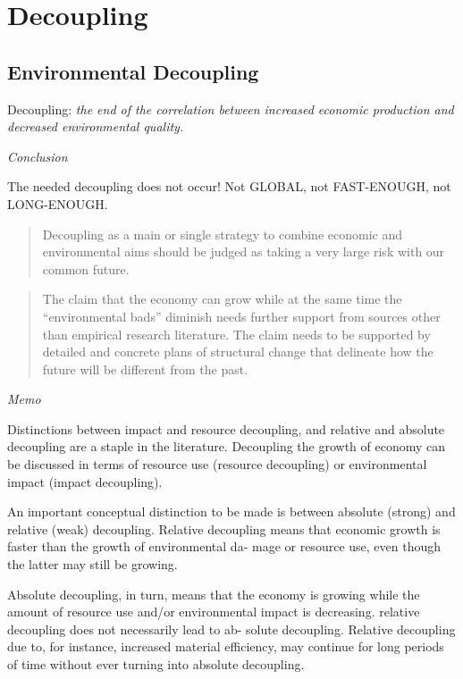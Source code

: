 \documentclass[
]{book}
\begin{document}
\hypertarget{decoupling}{%
\chapter{Decoupling}\label{decoupling}}

\hypertarget{environmental-decoupling}{%
\section{Environmental Decoupling}\label{environmental-decoupling}}

Decoupling: \emph{the end of the correlation between increased economic production and
decreased environmental quality.}

\emph{Conclusion}

The needed decoupling does not occur! Not GLOBAL, not FAST-ENOUGH, not LONG-ENOUGH.

\begin{quote}
Decoupling as a main or single strategy to combine
economic and environmental aims should be judged as taking a very
large risk with our common future.
\end{quote}

\begin{quote}
The claim that the economy can grow
while at the same time the ``environmental bads'' diminish needs further
support from sources other than empirical research literature. The
claim needs to be supported by detailed and concrete plans of structural
change that delineate how the future will be different from the past.
\end{quote}

\emph{Memo}

Distinctions between impact and resource decoupling,
and relative and absolute decoupling are a staple in the
literature.
Decoupling the growth of economy can be discussed
in terms of resource use (resource decoupling) or environmental impact
(impact decoupling).

An important conceptual distinction to be made is between absolute
(strong) and relative (weak) decoupling. Relative decoupling means
that economic growth is faster than the growth of environmental da-
mage or resource use, even though the latter may still be growing.

Absolute decoupling, in turn, means that the economy is growing while
the amount of resource use and/or environmental impact is decreasing.
relative decoupling does not necessarily lead to ab-
solute decoupling. Relative decoupling due to, for instance, increased
material efficiency, may continue for long periods of time without ever
turning into absolute decoupling.
\end{document}
